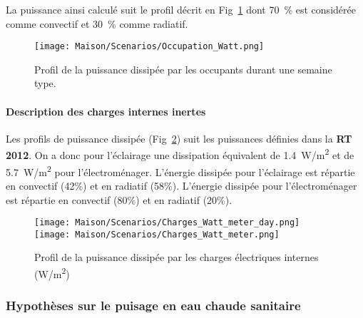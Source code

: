La puissance ainsi calculé suit le profil décrit en Fig~\ref{fig:occupation_scenario}
dont 70~\% est considérée comme convectif et 30~\% comme radiatif.

\begin{figure}
    \texttt{[image: Maison/Scenarios/Occupation\_Watt.png]}
    \caption{Profil de la puissance dissipée par les occupants durant une semaine type.}
    \label{fig:occupation_scenario}
\end{figure}

\paragraph{Description des charges internes inertes} %
\label{par:description_des_charges_internes_inertes}
Les profils de puissance dissipée (Fig~\ref{fig:charges_internes_scenario}) suit les puissances
définies dans la \textbf{RT 2012}.
On a donc pour l’éclairage une dissipation équivalent de 1.4~\si{W/m^{2}} et
de 5.7~\si{W/m^{2}} pour l’électroménager.
L’énergie dissipée pour l’éclairage est répartie en convectif (42\%) et en radiatif (58\%).
L’énergie dissipée pour l’électroménager est répartie en convectif (80\%) et en radiatif (20\%).

\begin{figure}
    \begin{center}
        \texttt{[image: Maison/Scenarios/Charges\_Watt\_meter\_day.png]}
        \texttt{[image: Maison/Scenarios/Charges\_Watt\_meter.png]}
    \end{center}
    \caption{Profil de la puissance dissipée par les charges électriques internes (\si{W/m^{2}})}
    \label{fig:charges_internes_scenario}
\end{figure}



\subsubsection{Hypothèses sur le puisage en eau chaude sanitaire} %
\label{ssub:hypotheses_sur_le_puisage_en_eau_chaude_sanitaire}

